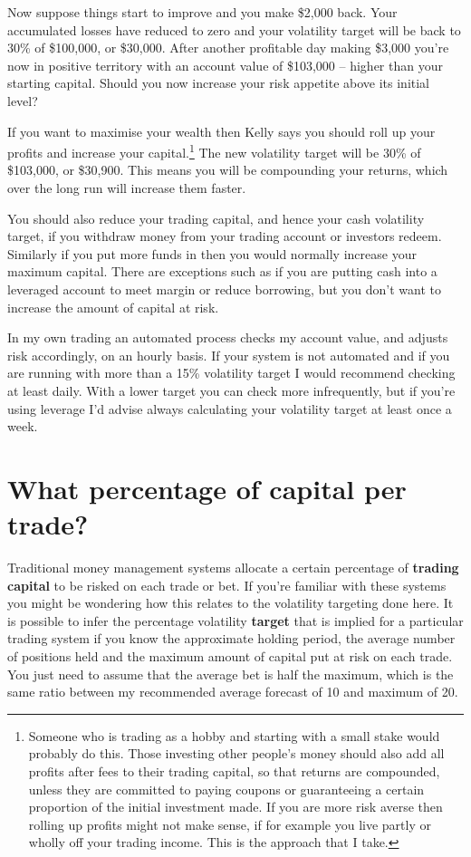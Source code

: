 Now suppose things start to improve and you make \$2,000 back. Your accumulated losses have reduced to zero and your volatility target will be back to 30\% of \$100,000, or \$30,000. After another profitable day making \$3,000 you're now in positive territory with an account value of \$103,000 -- higher than your starting capital. Should you now increase your risk appetite above its initial level?

If you want to maximise your wealth then Kelly says you should roll up your profits and increase your capital.\footnote{Someone who is trading as a hobby and starting with a small stake would probably do this. Those investing other people's money should also add all profits after fees to their trading capital, so that returns are compounded, unless they are committed to paying coupons or guaranteeing a certain proportion of the initial investment made. If you are more risk averse then rolling up profits might not make sense, if for example you live partly or wholly off your trading income. This is the approach that I take.} The new volatility target will be 30\% of \$103,000, or \$30,900. This means you will be compounding your returns, which over the long run will increase them faster.

You should also reduce your trading capital, and hence your cash volatility target, if you withdraw money from your trading account or investors redeem. Similarly if you put more funds in then you would normally increase your maximum capital. There are exceptions such as if you are putting cash into a leveraged account to meet margin or reduce borrowing, but you don't want to increase the amount of capital at risk.

In my own trading an automated process checks my account value, and adjusts risk accordingly, on an hourly basis. If your system is not automated and if you are running with more than a 15\% volatility target I would recommend checking at least daily. With a lower target you can check more infrequently, but if you're using leverage I'd advise always calculating your volatility target at least once a week.

\section*{What percentage of capital per trade?}  {}

Traditional money management systems allocate a certain percentage of \textbf{trading capital} to be risked on each trade or bet. If you're familiar with these systems you might be wondering how this relates to the volatility targeting done here. It is possible to infer the percentage volatility \textbf{target} that is implied for a particular trading system if you know the approximate holding period, the average number of positions held and the maximum amount of capital put at risk on each trade. You just need to assume that the average bet is half the maximum, which is the same ratio between my recommended average forecast of 10 and maximum of 20.

